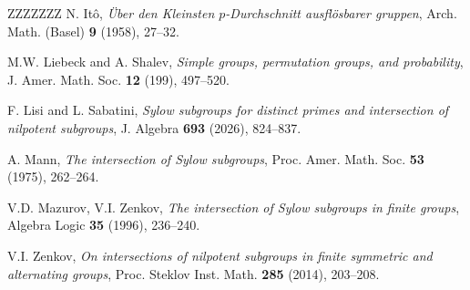 \documentclass[11pt]{amsart}
\numberwithin{equation}{section}
\theoremstyle{definition}
\theoremstyle{remark}
\begin{document}
\begin{thebibliography}{ZZZZZZZ}
 N. It\^o,
   \textit{\"Uber den Kleinsten $p$-Durchschnitt ausfl\"osbarer gruppen},
   Arch. Math. (Basel) \textbf{9} (1958), 27--32.

    M.W. Liebeck and A. Shalev,
   \textit{Simple groups, permutation groups, and probability},
   J. Amer. Math. Soc. \textbf{12} (199), 497--520.
   
     F. Lisi and L. Sabatini,
   \textit{Sylow subgroups for distinct primes and intersection of nilpotent subgroups},
   J. Algebra \textbf{693} (2026), 824--837.
   
  
    A. Mann,
   \textit{The intersection of Sylow subgroups},
   Proc. Amer. Math. Soc. \textbf{53} (1975), 262--264.

     V.D. Mazurov, V.I. Zenkov,
   \textit{The intersection of Sylow subgroups in finite groups},
   Algebra Logic \textbf{35} (1996), 236--240.

    V.I. Zenkov,
   \textit{On intersections of nilpotent subgroups in finite symmetric and alternating groups},
   Proc. Steklov Inst. Math. \textbf{285} (2014), 203--208.


   \end{thebibliography}
   
   \vspace{0.2cm}
\end{document}
